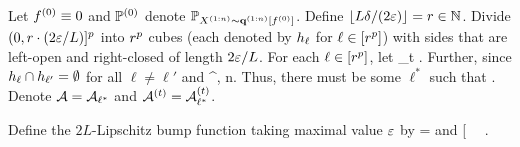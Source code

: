Let $f^{(0)} \equiv 0$ and $\PP\nullind$ denote $\mathbb{P}_{X^{(1:n)}\sim\mathbf{q}^{(1:n)}[f^{(0)}]}$. 
Define $\lfloor L\delta/(2\varepsilon) \rfloor = r \in \mathbb{N}$.
Divide $(0,r \cdot (2\varepsilon/L)]^p$ into $r^p$ cubes (each denoted by $h_{\ell}$ for $\ell\in[r^p]$) with sides that are left-open and right-closed of length $2\varepsilon/L$.
For each $\ell \in [r^p]$, let
%
%
%
%
%
%
%
%
\*[
    \sampcompevent\timeind{t}\feat{\ell} = \Big\{\covobs\timeind{t} \in \cube\feat{\ell} \Big\}
\]
and
\*[
    \sampcompevent\feat{\ell} = \bigcup_{t\in[n]} \sampcompevent\timeind{t}\feat{\ell}.
\]
By a union bound,
\*[
    \PP\nullind[\sampcompevent\feat{\ell}] \leq \sum_{t\in[n]} \PP{}.
\]
Further, since $h_{\ell} \cap h_{\ell'} = \emptyset$ for all $\ell \neq \ell'$ and
^\covdim,
\]
\*[
    \sum_{\ell\in[\inoutratio^\covdim]} \sum_{t\in[n]} \PP\nullind[\sampcompevent\timeind{t}\feat{\ell}]
    \leq n.
\]
Thus, there must be some $\ell^*$ such that 
\*[
    \sum_{t\in[n]} \PP\nullind[\sampcompevent\timeind{t}\feat{\ell^*}]
    \leq {}.
\]
Denote $\mathcal{A} = \mathcal{A}_{\ell^*}$ and $\mathcal{A}^{(t)} = \mathcal{A}^{(t)}_{\ell^*}$.
%
%
%
%
%
%
%
%
%

Define the $2L$-Lipschitz bump function taking maximal value $\varepsilon$ by
\*[
    \model\altind(\covval)
    &=
    \begin{cases}
    0 &\covval \not\in\cube\feat{\ell^*} \\
    \text{square-based pyramid} &\covval\in\cube\feat{\ell^*}.
    \end{cases}
\]
Observe that $\model\altind\in\modelspace$ by \cref{assn:piecewise}.
Similarly to $\PP\nullind$, let $\PP\altind$ denote $\PP_{\covobs\timeind{1:n}\sim\queryalgo\timeind{1:n}[\model\altind]}$.
Since $\model\timeind{0} = \model\timeind{1}$ outside of $\cube\feat{\ell^*}$, it holds that
\*[
    \PP\nullind[\sampcompevent] = \PP\altind[\sampcompevent]
\]
and
\*[
    \disteq
    \ \Bigcondsym \
    \comp{\sampcompevent}.
\]
%
%
%
%
%
%

